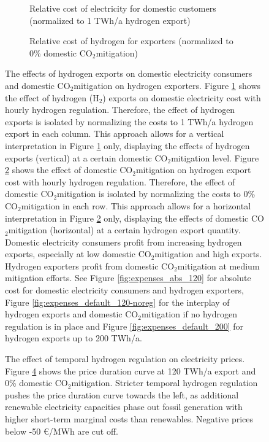 \documentclass[5p,numafflabel]{elsarticle}
\newcommand{\co}{\ce{CO2}~}
\def\co{CO${}_2${\:}}
\begin{document}
\begin{figure}[h!]
    \centering
    \begin{subfigure}[b]{0.49\linewidth}
        \centering
        \caption{Relative cost of electricity for domestic customers (normalized to 1 TWh/a hydrogen export)}
        \label{fig:expense_ac_120}
    \end{subfigure}
    \hfill
    \begin{subfigure}[b]{0.49\linewidth}
        \centering
        \caption{Relative cost of hydrogen for exporters (normalized to 0\% domestic \co mitigation)}
        \label{fig:expense_h2_120}
    \end{subfigure}
    \hfill
    \caption{
    The effects of hydrogen exports on domestic electricity consumers and domestic \co mitigation on hydrogen exporters.
    Figure \ref{fig:expense_ac_120} shows the effect of hydrogen ({H${}_2${}}) exports on domestic electricity cost with hourly hydrogen regulation. Therefore, the effect of hydrogen exports is isolated by normalizing the costs to 1 TWh/a hydrogen export in each column. This approach allows for a vertical interpretation in Figure \ref{fig:expense_ac_120} only, displaying the effects of hydrogen exports (vertical) at a certain domestic \co mitigation level.
    Figure \ref{fig:expense_h2_120} shows the effect of domestic \co mitigation on hydrogen export cost with hourly hydrogen regulation. Therefore, the effect of domestic \co mitigation is isolated by normalizing the costs to 0\% \co mitigation in each row. This approach allows for a horizontal interpretation in Figure \ref{fig:expense_h2_120} only, displaying the effects of domestic \co mitigation (horizontal) at a certain hydrogen export quantity.
    Domestic electricity consumers profit from increasing hydrogen exports, especially at low domestic \co mitigation and high exports. Hydrogen exporters profit from domestic \co mitigation at medium mitigation efforts.
    See Figure \ref{fig:expenses_abs_120} for absolute cost for domestic electricity consumers and hydrogen exporters, Figure \ref{fig:expenses_default_120-noreg} for the interplay of hydrogen exports and domestic \co mitigation if no hydrogen regulation is in place and Figure \ref{fig:expenses_default_200} for hydrogen exports up to 200 TWh/a.
    }
    \label{fig:expenses_default_120}
\end{figure}


\begin{figure}[h!]
    \centering
    \caption{
    The effect of temporal hydrogen regulation on electricity prices.
    Figure \ref{fig:pdc-120-0} shows the price duration curve at 120 TWh/a export and 0\% domestic \co mitigation. Stricter temporal hydrogen regulation pushes the price duration curve towards the left, as additional renewable electricity capacities phase out fossil generation with higher short-term marginal costs than renewables. Negative prices below -50 €/MWh are cut off.}
    \label{fig:pdc-120-0}
\end{figure}
\end{document}
